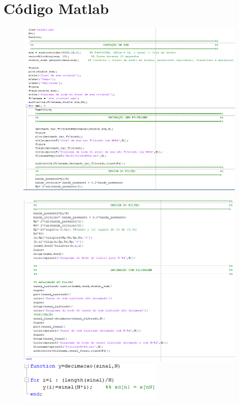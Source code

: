 \documentclass[11pt]{article}
\begin{document}
\section{Código Matlab}
\begin{figure}[h]
\begin{center}
\includegraphics[width=17cm]{matlab1.png}
\end{center}
\end{figure}
\newpage
\begin{figure}[h]
\includegraphics[width=16cm]{matlab2.png}
\\
\includegraphics[width=7cm]{matlab3.png}
\end{figure}
\newpage
\end{document}
